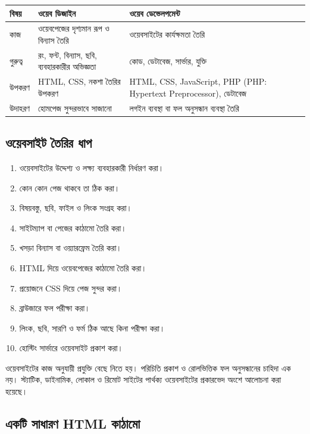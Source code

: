\begin{center}
\begin{tabular}{|p{}|p{}|p{}|}
\hline
\textbf{বিষয়} & \textbf{ওয়েব ডিজাইন} & \textbf{ওয়েব ডেভেলপমেন্ট} \\
\hline
কাজ & ওয়েবপেজের দৃশ্যমান রূপ ও বিন্যাস তৈরি & ওয়েবসাইটের কার্যক্ষমতা তৈরি \\
\hline
গুরুত্ব & রং, ফন্ট, বিন্যাস, ছবি, ব্যবহারকারীর অভিজ্ঞতা & কোড, ডেটাবেজ, সার্ভার, যুক্তি \\
\hline
উপকরণ & HTML, CSS, নকশা তৈরির উপকরণ & HTML, CSS, JavaScript, PHP (PHP: Hypertext Preprocessor), ডেটাবেজ \\
\hline
উদাহরণ & হোমপেজ সুন্দরভাবে সাজানো & লগইন ব্যবস্থা বা ফল অনুসন্ধান ব্যবস্থা তৈরি \\
\hline
\end{tabular}
\end{center}



\subsection{ওয়েবসাইট তৈরির ধাপ}

\begin{enumerate}
\item ওয়েবসাইটের উদ্দেশ্য ও লক্ষ্য ব্যবহারকারী নির্ধারণ করা।
\item কোন কোন পেজ থাকবে তা ঠিক করা।
\item বিষয়বস্তু, ছবি, ফাইল ও লিংক সংগ্রহ করা।
\item সাইটম্যাপ বা পেজের কাঠামো তৈরি করা।
\item খসড়া বিন্যাস বা ওয়্যারফ্রেম তৈরি করা।
\item HTML দিয়ে ওয়েবপেজের কাঠামো তৈরি করা।
\item প্রয়োজনে CSS দিয়ে পেজ সুন্দর করা।
\item ব্রাউজারে ফল পরীক্ষা করা।
\item লিংক, ছবি, সারণি ও ফর্ম ঠিক আছে কিনা পরীক্ষা করা।
\item হোস্টিং সার্ভারে ওয়েবসাইট প্রকাশ করা।
\end{enumerate}

ওয়েবসাইটের কাজ অনুযায়ী প্রযুক্তি বেছে নিতে হয়। পরিচিতি প্রকাশ ও রোলভিত্তিক ফল অনুসন্ধানের চাহিদা এক নয়। স্ট্যাটিক, ডাইনামিক, লোকাল ও রিমোট সাইটের পার্থক্য ওয়েবসাইটের প্রকারভেদ অংশে আলোচনা করা হয়েছে।

\subsection{একটি সাধারণ HTML কাঠামো}

